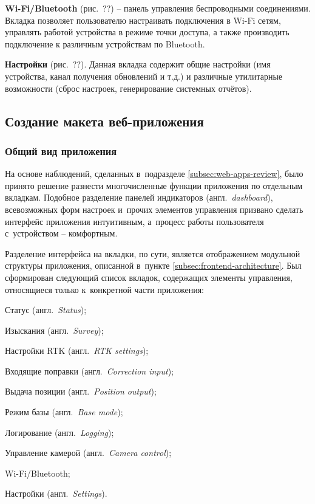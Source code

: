 \textbf{Wi-Fi/Bluetooth} (рис.~??) -- панель управления беспроводными соединениями. Вкладка позволяет пользователю настраивать подключения в Wi-Fi сетям, управлять работой устройства в режиме точки доступа, а также производить подключение к различным устройствам по Bluetooth.

\textbf{Настройки} (рис.~??). Данная вкладка содержит общие настройки (имя устройства, канал получения обновлений и т.д.) и различные утилитарные возможности (сброс настроек, генерирование системных отчётов).

\subsection{Создание макета веб-приложения}
\label{subsec:app-sketch}

\subsubsection{Общий вид приложения}
\label{subsec:app-sketch-general}

На основе наблюдений, сделанных в~подразделе \ref{subsec:web-apps-review}, было принято решение разнести многочисленные функции приложения по отдельным вкладкам. Подобное разделение панелей индикаторов (англ.~\emph{dashboard}), всевозможных форм настроек и~прочих элементов управления призвано сделать интерфейс приложения интуитивным, а~процесс работы пользователя с~устройством -- комфортным.

Разделение интерфейса на вкладки, по сути, является отображением модульной структуры приложения, описанной в~пункте \ref{subsec:frontend-architecture}. Был сформирован следующий список вкладок, содержащих элементы управления, относящиеся только к~конкретной части приложения:

\begin{dashitemize}
  \item Статус (англ.~\emph{Status});
  \item Изыскания (англ.~\emph{Survey});
  \item Настройки RTK (англ.~\emph{RTK settings});
  \item Входящие поправки (англ.~\emph{Correction input});
  \item Выдача позиции (англ.~\emph{Position output});
  \item Режим базы (англ.~\emph{Base mode});
  \item Логирование (англ.~\emph{Logging});
  \item Управление камерой (англ.~\emph{Camera control});
  \item Wi-Fi/Bluetooth;
  \item Настройки (англ.~\emph{Settings}).
\end{dashitemize}

